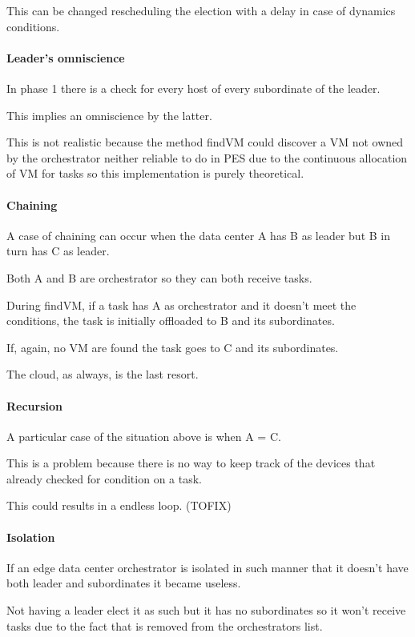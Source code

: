 \documentclass[12pt]{report}
\begin{document}
This can be changed rescheduling the election with a delay in case of dynamics conditions.

\paragraph{Leader's omniscience}
In phase 1 there is a check for every host of every subordinate of the leader.

This implies an omniscience by the latter.

This is not realistic because the method findVM could discover a VM not owned by the orchestrator neither reliable to do in PES due to the continuous allocation of VM for tasks so this implementation is purely theoretical.

\paragraph{Chaining}
A case of chaining can occur when the data center A has B as leader but B in turn has C as leader.

Both A and B are orchestrator so they can both receive tasks.

During findVM, if a task has A as orchestrator and it doesn't meet the conditions, the task is initially offloaded to B and its subordinates.

If, again, no VM are found the task goes to C and its subordinates.

The cloud, as always, is the last resort.


\paragraph{Recursion}
A particular case of the situation above is when A = C.

This is a problem because there is no way to keep track of the devices that already checked for condition on a task.

This could results in a endless loop. (TOFIX)


\paragraph{Isolation}
If an edge data center orchestrator is isolated in such manner that it doesn't have both leader and subordinates it became useless.

Not having a leader elect it as such but it has no subordinates so it won't receive tasks due to the fact that is removed from the orchestrators list.
\end{document}
